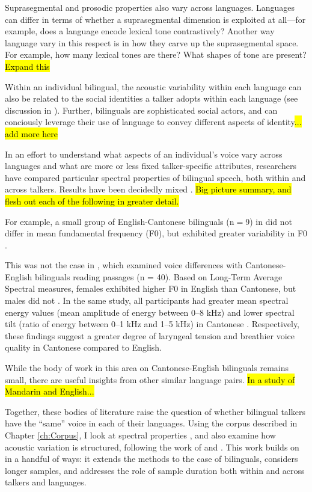 Suprasegmental and prosodic properties also vary across languages. Languages can differ in terms of whether a suprasegmental dimension is exploited at all---for example, does a language encode lexical tone contrastively? Another way language vary in this respect is in how they carve up the suprasegmental space. For example, how many lexical tones are there? What shapes of tone are present? \hl{Expand this}

Within an individual bilingual, the acoustic variability within each language can also be related to the social identities a talker adopts within each language (see discussion in \citet{cheng_2020_f0}). Further, bilinguals are sophisticated social actors, and can conciously leverage their use of language to convey different aspects of identity\hl{... add more here}

In an effort to understand what aspects of an individual's voice vary across languages and what are more or less fixed talker-specific attributes, researchers have compared particular spectral properties of bilingual speech, both within and across talkers. Results have been decidedly mixed \citep{cheng_2020_f0,altenberg_2006_f0,ryabov_2016_self}. \hl{Big picture summary, and flesh out each of the following in greater detail.}

For example, a small group of English-Cantonese bilinguals (n$=$9) in did not differ in mean fundamental frequency (F0), but exhibited greater variability in F0 \citep{altenberg_2006_f0}. 

This was not the case in \citet{ng_2012_ltas}, which examined voice differences with Cantonese-English bilinguals reading passages (n = 40). Based on Long-Term Average Spectral measures, females exhibited higher F0 in English than Cantonese, but males did not \citep{ng_2012_ltas}. In the same study, all participants had greater mean spectral energy values (mean amplitude of energy between 0--8 kHz) and lower spectral tilt (ratio of energy between 0--1 kHz and 1--5 kHz) in Cantonese \citep{ng_2012_ltas}. Respectively, these findings suggest a greater degree of laryngeal tension and breathier voice quality in Cantonese compared to English.

While the body of work in this area on Cantonese-English bilinguals remains small, there are useful insights from other similar language pairs. \hl{In a study of Mandarin and English...}

Together, these bodies of literature raise the question of whether bilingual talkers have the ``same'' voice in each of their languages. Using the corpus described in Chapter \ref{ch:Corpus}, I look at spectral properties \citep{cheng_2020_f0,altenberg_2006_f0, ryabov_2016_self,ng_2012_ltas}, and also examine how acoustic variation is structured, following the work of \citet{kreiman_2014_theory} and \citet{lee_2019_acoustic-paper}. This work builds on \citet{lee_2019_acoustic-paper} in a handful of ways: it extends the methods to the case of bilinguals, considers longer samples, and addresses the role of sample duration both within and across talkers and languages. 

